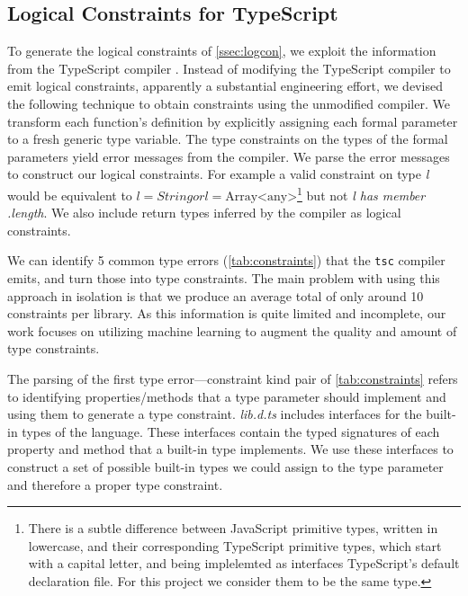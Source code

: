 \documentclass[sigplan,10pt,anonymous]{acmart} %
\newcommand{\margincomment}[2]{\marginpar{\scriptsize\color{Maroon}#1 says: #2}}
\newcommand{\adg}[1]{\margincomment{ADG}{#1}}
\theoremstyle{plain}
\theoremstyle{remark}
\theoremstyle{definition}
\begin{document}
\subsection{Logical Constraints for TypeScript}\label{ssec:logprodts}
To generate the logical constraints of \cref{ssec:logcon},
we exploit the information from the TypeScript compiler \cite{typescript}.
%
Instead of modifying the TypeScript compiler to emit logical constraints,
apparently a substantial engineering effort,
we devised the following technique to obtain constraints using the unmodified compiler.
%
We transform each function's definition by
explicitly assigning each formal parameter to a fresh generic type variable.
%
The type constraints on the types of the formal parameters yield error messages from the compiler.
%
We parse the error messages to construct our logical constraints.
%
\adg{this example is rather out of context}
For example a valid constraint on type \textit{l} would be equivalent to
$l = String \mathrel{or} l = \text{Array<any>}$\footnote{There is a subtle difference between JavaScript primitive types, written in lowercase, and their corresponding TypeScript primitive types, which start with a capital letter, and being implelemted as interfaces TypeScript's default declaration file. For this project we consider them to be the same type.} but not \textit{l has member .length}.
%
We also include return types inferred by the compiler as logical constraints.
%

We can identify 5 common type errors (\cref{tab:constraints}) that the \texttt{tsc}
compiler emits, and turn those into type constraints. The main problem with using
this approach in isolation is that we produce an average total
of only around 10 constraints per library. As this information is quite
limited and incomplete, our work focuses on utilizing machine learning to augment
the quality and amount of type constraints.

The parsing of the first type error---constraint kind pair of \cref{tab:constraints}
refers to identifying properties/methods that a type parameter should implement
and using them to generate a type constraint.
\textit{lib.d.ts} includes interfaces for the built-in types of the language.
These interfaces contain the typed signatures of each property and method
that a built-in type implements. We use these interfaces to construct a set of
possible built-in types we could assign to the type parameter and therefore a proper
type constraint. 
\end{document}
